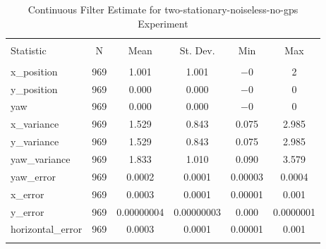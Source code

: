 
\begin{table}[h] \centering 
  \caption{Continuous Filter Estimate for two-stationary-noiseless-no-gps Experiment} 
  \label{tab:two_stationary_noiseless_no_gps_continuous_summary} 
\begin{tabular}{@{\extracolsep{5pt}}lccccc} 
\\[-1.8ex]\hline 
\hline \\[-1.8ex] 
Statistic & \multicolumn{1}{c}{N} & \multicolumn{1}{c}{Mean} & \multicolumn{1}{c}{St. Dev.} & \multicolumn{1}{c}{Min} & \multicolumn{1}{c}{Max} \\ 
\hline \\[-1.8ex] 
x\_position & 969 & 1.001 & 1.001 & $-$0 & 2 \\ 
y\_position & 969 & 0.000 & 0.000 & $-$0 & 0 \\ 
yaw & 969 & 0.000 & 0.000 & $-$0 & 0 \\ 
x\_variance & 969 & 1.529 & 0.843 & 0.075 & 2.985 \\ 
y\_variance & 969 & 1.529 & 0.843 & 0.075 & 2.985 \\ 
yaw\_variance & 969 & 1.833 & 1.010 & 0.090 & 3.579 \\ 
yaw\_error & 969 & 0.0002 & 0.0001 & 0.00003 & 0.0004 \\ 
x\_error & 969 & 0.0003 & 0.0001 & 0.00001 & 0.001 \\ 
y\_error & 969 & 0.00000004 & 0.00000003 & 0.000 & 0.0000001 \\ 
horizontal\_error & 969 & 0.0003 & 0.0001 & 0.00001 & 0.001 \\ 
\hline \\[-1.8ex] 
\end{tabular} 
\end{table} 
